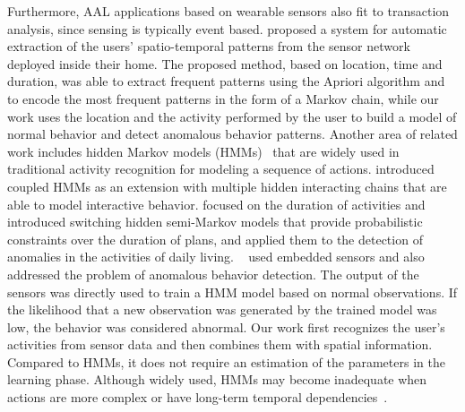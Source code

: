 Furthermore, AAL applications based on wearable sensors also fit to transaction analysis, since sensing is typically event based. \cite{Lymberopoulos} proposed a system for automatic extraction of the users' spatio-temporal patterns from the sensor network deployed inside their home. The proposed method, based on location, time and duration, was able to extract frequent patterns using the Apriori algorithm and to encode the most frequent patterns in the form of a Markov chain, while our work uses the location and the activity performed by the user to build a model of normal behavior and detect anomalous behavior patterns. 
 Another area of related work includes hidden Markov models (HMMs)~\citep{Rabiner1989} that are widely used in traditional activity recognition for modeling a sequence of actions.  \cite{Brand} introduced coupled HMMs as an extension with multiple hidden interacting chains that are able to model interactive behavior. 
\cite{Duong2005} focused on the duration of activities and introduced switching hidden semi-Markov models that provide probabilistic constraints over the duration of plans, and applied them to the detection of anomalies in the activities of daily living. 
~\cite{Monekosso} used embedded sensors and also addressed the problem of anomalous behavior detection. The output of the sensors was directly used to train a HMM model based on normal observations. If the likelihood that a new observation was generated by the trained model was low, the behavior was considered abnormal. Our work first recognizes the user's activities from sensor data and then combines them with spatial information. Compared to HMMs, it does not require an estimation of the parameters in the learning phase.
Although widely used, HMMs may become inadequate when actions are more complex or have long-term temporal dependencies~\citep{KollerFriedman2009}. 

